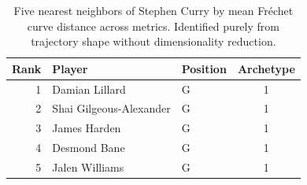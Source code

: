 \begin{table}[htbp]
  \centering\small
  \begin{tabular}{rllc}
    \toprule
    Rank & Player & Position & Archetype \\
    \midrule
    1 & Damian Lillard & G & 1 \\
    2 & Shai Gilgeous-Alexander & G & 1 \\
    3 & James Harden & G & 1 \\
    4 & Desmond Bane & G & 1 \\
    5 & Jalen Williams & G & 1 \\
    \bottomrule
  \end{tabular}
  \caption{Five nearest neighbors of Stephen Curry by mean Fr\'{e}chet curve distance across metrics. Identified purely from trajectory shape without dimensionality reduction.}
  \label{tab:Stephen_Curry_frechet_curve_neighbors}
\end{table}

